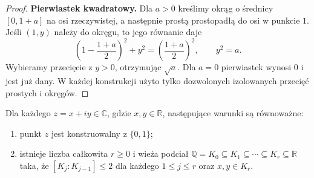 \begin{proof}
\textbf{Pierwiastek kwadratowy.}
Dla $a>0$ kreślimy okrąg o średnicy
$[0,1+a]$ na osi rzeczywistej, a następnie
prostą prostopadłą do osi w punkcie $1$.
Jeśli $(1,y)$ należy do okręgu, to jego równanie daje
\[
 \left(1-\frac{1+a}{2}\right)^2+y^2
 =\left(\frac{1+a}{2}\right)^2,
 \qquad y^2=a.
\]
Wybieramy przecięcie z $y>0$, otrzymując $\sqrt a$.
Dla $a=0$ pierwiastek wynosi $0$ i jest już dany.
W każdej konstrukcji użyto tylko dozwolonych
izolowanych przecięć prostych i okręgów.
\end{proof}

\begin{twierdzenie}\label{aa:tw:constructibility-tower}
Dla każdego $z=x+iy\in\mathbb C$, gdzie $x,y\in\mathbb R$,
następujące warunki są równoważne:
\begin{enumerate}
\item punkt $z$ jest konstruowalny z $\{0,1\}$;
\item istnieje liczba całkowita $r\ge0$ i wieża podciał
$\mathbb Q=K_0\subseteq K_1\subseteq\cdots\subseteq K_r
\subseteq\mathbb R$ taka, że
$[K_j:K_{j-1}]\le2$ dla każdego $1\le j\le r$
oraz $x,y\in K_r$.
\end{enumerate}
\end{twierdzenie}
